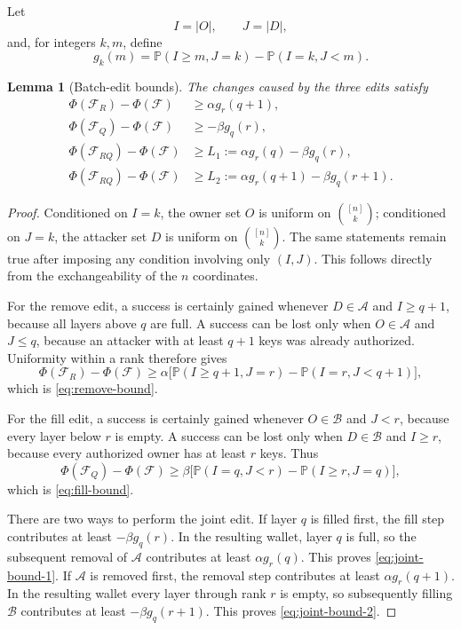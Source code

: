 \documentclass[11pt]{article}
\newtheorem{lemma}[theorem]{Lemma}
\newcommand{\PP}{\mathbb P}
\newcommand{\cF}{\mathcal F}
\newcommand{\cA}{\mathcal A}
\newcommand{\cB}{\mathcal B}
\newcommand{\1}{\mathbf 1}
\begin{document}
Let
\[
I=|O|,
\qquad
J=|D|,
\]
and, for integers $k,m$, define
\begin{equation}\label{eq:def-g}
g_k(m)=\PP(I\geq m,J=k)-\PP(I=k,J<m).
\end{equation}

\begin{lemma}[Batch-edit bounds]\label{lem:batch-bounds}
The changes caused by the three edits satisfy
\begin{align}
\Phi(\cF_R)-\Phi(\cF)
   &\geq \alpha g_r(q+1),\label{eq:remove-bound}\\
\Phi(\cF_Q)-\Phi(\cF)
   &\geq-\beta g_q(r),\label{eq:fill-bound}\\
\Phi(\cF_{RQ})-\Phi(\cF)
   &\geq L_1:=\alpha g_r(q)-\beta g_q(r),\label{eq:joint-bound-1}\\
\Phi(\cF_{RQ})-\Phi(\cF)
   &\geq L_2:=\alpha g_r(q+1)-\beta g_q(r+1).
   \label{eq:joint-bound-2}
\end{align}
\end{lemma}

\begin{proof}
Conditioned on $I=k$, the owner set $O$ is uniform on
$\binom{[n]}k$; conditioned on $J=k$, the attacker set $D$ is uniform
on $\binom{[n]}k$.  The same statements remain true after imposing any
condition involving only $(I,J)$.  This follows directly from the
exchangeability of the $n$ coordinates.

For the remove edit, a success is certainly gained whenever
$D\in\cA$ and $I\geq q+1$, because all layers above $q$ are full.  A
success can be lost only when $O\in\cA$ and $J\leq q$, because an
attacker with at least $q+1$ keys was already authorized.  Uniformity
within a rank therefore gives
\[
\Phi(\cF_R)-\Phi(\cF)
\geq
\alpha\bigl[\PP(I\geq q+1,J=r)-\PP(I=r,J<q+1)\bigr],
\]
which is \eqref{eq:remove-bound}.

For the fill edit, a success is certainly gained whenever $O\in\cB$
and $J<r$, because every layer below $r$ is empty.  A success can be
lost only when $D\in\cB$ and $I\geq r$, because every authorized owner
has at least $r$ keys.  Thus
\[
\Phi(\cF_Q)-\Phi(\cF)
\geq
\beta\bigl[\PP(I=q,J<r)-\PP(I\geq r,J=q)\bigr],
\]
which is \eqref{eq:fill-bound}.

There are two ways to perform the joint edit.  If layer $q$ is filled
first, the fill step contributes at least $-\beta g_q(r)$.  In the
resulting wallet, layer $q$ is full, so the subsequent removal of
$\cA$ contributes at least $\alpha g_r(q)$.  This proves
\eqref{eq:joint-bound-1}.  If $\cA$ is removed first, the removal step
contributes at least $\alpha g_r(q+1)$.  In the resulting wallet every
layer through rank $r$ is empty, so subsequently filling $\cB$
contributes at least $-\beta g_q(r+1)$.  This proves
\eqref{eq:joint-bound-2}.
\end{proof}
\end{document}
